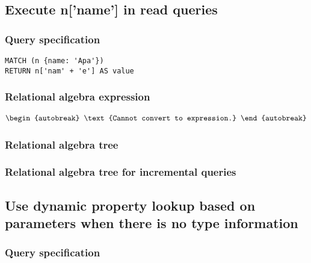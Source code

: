 
\subsection{Execute n['name'] in read queries}

\subsubsection*{Query specification}

\begin{lstlisting}
MATCH (n {name: 'Apa'})
RETURN n['nam' + 'e'] AS value
\end{lstlisting}

\subsubsection*{Relational algebra expression}

\begin{align*}
\begin{autobreak}
\text{Cannot convert to expression.}
\end{autobreak}
\end{align*}

\subsubsection*{Relational algebra tree}


\subsubsection*{Relational algebra tree for incremental queries}


\subsection{Use dynamic property lookup based on parameters when there is no type information}

\subsubsection*{Query specification}

